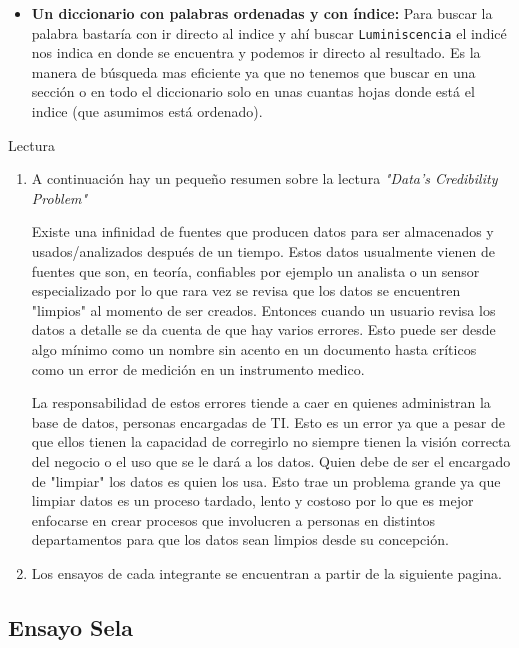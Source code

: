 \documentclass{exam}
\begin{document}
\begin{questions}
\begin{enumerate}[label=\alph*.]
\begin{itemize}
			\item \textbf{Un diccionario con palabras ordenadas y con índice: }Para buscar la palabra bastaría con ir directo al indice y ahí buscar \texttt{Luminiscencia} el indicé nos indica en donde se encuentra y podemos ir directo al resultado. Es la manera de búsqueda mas eficiente ya que no tenemos que buscar en una sección o en todo el diccionario solo en unas cuantas hojas donde está el indice (que asumimos está ordenado).
		\end{itemize}
	\end{enumerate}
	
	\question Lectura
	\begin{enumerate}[label=\alph*.]
		\item A continuación hay un pequeño resumen sobre la lectura \textit{"Data’s Credibility Problem"}
		
		Existe una infinidad de fuentes que producen datos para ser almacenados y usados/analizados después de un tiempo. Estos datos usualmente vienen de fuentes que son, en teoría, confiables por ejemplo un analista o un sensor especializado por lo que rara vez se revisa que los datos se encuentren "limpios" al momento de ser creados. Entonces cuando un usuario revisa los datos a detalle se da cuenta de que hay varios errores. Esto puede ser desde algo mínimo como un nombre sin acento en un documento hasta críticos como un error de medición en un instrumento medico.
		
		La responsabilidad de estos errores tiende a caer en quienes administran la base de datos, personas encargadas de TI. Esto es un error ya que a pesar de que ellos tienen la capacidad de corregirlo no siempre tienen la visión correcta del negocio o el uso que se le dará a los datos. Quien debe de ser el encargado de "limpiar" los datos es quien los usa. Esto trae un problema grande ya que limpiar datos es un proceso tardado, lento y costoso por lo que es mejor enfocarse en crear procesos que involucren a personas en distintos departamentos para que los datos sean limpios desde su concepción.
		
		
				
		\item Los ensayos de cada integrante se encuentran a partir de la siguiente pagina.
	\end{enumerate}		
\end{questions}


\pagebreak

\subsection*{Ensayo Sela}
\end{document}
